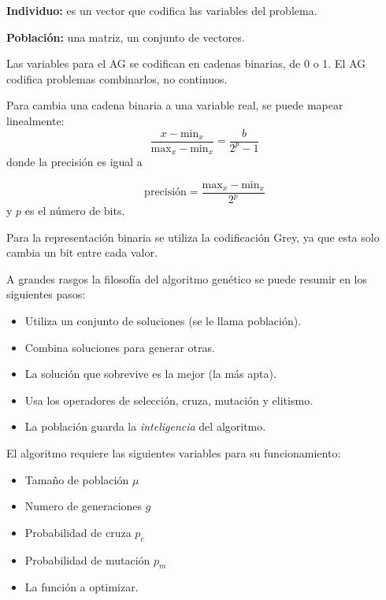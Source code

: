 \documentclass[conference]{IEEEtran}
\begin{document}
\textbf{Individuo:} es un vector que codifica las variables del problema.

\textbf{Población:} una matriz, un conjunto de vectores.

Las variables para el AG se codifican en cadenas binarias, de 0 o 1. El AG codifica problemas combinarlos, no continuos.

Para cambia una cadena binaria a una variable real, se puede mapear linealmente:
\begin{equation}
\frac{x - \text{min}_{x}}{\text{max}_x - \text{min}_x} = \frac{b}{2^{p} -1}
\end{equation}
donde  la precisión es igual a 

\begin{equation}
 \text{precisión} = \frac{\text{max}_x - \text{min}_x}{2^{p}}
\end{equation} 
y $p$ es el número de bits.

Para la representación binaria se utiliza la codificación Grey, ya que esta solo cambia un bit entre cada valor.

A grandes rasgos la filosofía del algoritmo genético se puede resumir en los siguientes pasos: 
\begin{itemize}
\item Utiliza un conjunto de soluciones (se le llama población).
\item Combina soluciones para generar otras.
\item La solución que sobrevive es la mejor (la más apta).
\item Usa los operadores de selección, cruza, mutación y elitismo.
\item La población guarda la \textit{inteligencia} del algoritmo.
\end{itemize}




El algoritmo requiere las siguientes variables para su funcionamiento:
\begin{itemize}
\item Tamaño de población $\mu$
\item Numero de generaciones $g$
\item Probabilidad de cruza $p_{c}$
\item Probabilidad de mutación $p_{m}$
\item La función a optimizar.
\end{itemize}
\end{document}
